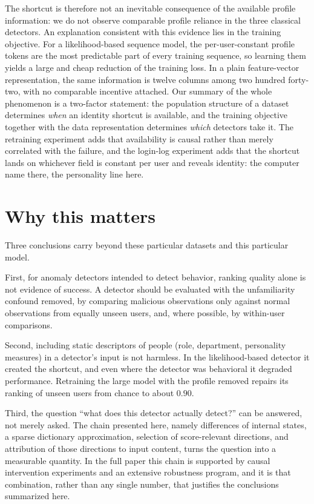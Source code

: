 \documentclass[10pt]{article}
\begin{document}
The shortcut is therefore not an inevitable consequence of the
available profile information: we do not observe comparable profile
reliance in the three classical detectors. An explanation consistent
with this evidence lies in the training objective. For a
likelihood-based sequence model, the per-user-constant profile tokens
are the most predictable part of every training sequence, so learning
them yields a large and cheap reduction of the training loss. In
a plain feature-vector representation, the same information is twelve
columns among two hundred forty-two, with no comparable incentive
attached. Our summary of the whole phenomenon is a two-factor statement:
the population structure of a dataset determines \emph{when} an
identity shortcut is available, and the training objective together with
the data representation determines \emph{which} detectors take it. The retraining experiment adds
that availability is causal rather than merely correlated with the
failure, and the login-log experiment adds that the shortcut lands on
whichever field is constant per user and reveals identity: the computer
name there, the personality line here.

\section{Why this matters}

Three conclusions carry beyond these particular datasets and this
particular model.

First, for anomaly detectors intended to detect behavior, ranking
quality alone is not evidence of success. A detector should be evaluated
with the unfamiliarity confound removed, by comparing malicious
observations only against normal observations from equally unseen
users, and, where possible, by within-user comparisons.

Second, including static descriptors of people (role, department,
personality measures) in a detector's input is not harmless. In the
likelihood-based detector it created the shortcut, and even where the
detector was behavioral it degraded performance. Retraining the large
model with the profile removed repairs its ranking of unseen users from
chance to about $0.90$.

Third, the question ``what does this detector actually detect?'' can be
answered, not merely asked. The chain presented here, namely
differences of internal states, a sparse dictionary approximation,
selection of score-relevant directions, and attribution of those
directions to input content, turns the question into a measurable
quantity. In the full paper this chain is supported by causal
intervention experiments and an extensive robustness program, and it is
that combination, rather than any single number, that justifies the
conclusions summarized here.
\end{document}
